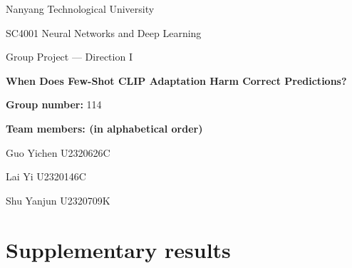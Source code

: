 \documentclass[a4paper,10pt,onecolumn]{article}
\newcommand{\reporttitle}{When Does Few-Shot CLIP Adaptation Harm Correct Predictions?}
\begin{document}
\begin{titlepage}
\centering
\vspace*{25mm}
{\Large Nanyang Technological University\par}
\vspace{12mm}
{\large SC4001 Neural Networks and Deep Learning\par}
{\large Group Project --- Direction I\par}
\vspace{20mm}
{\LARGE\bfseries \reporttitle\par}
\vspace{20mm}
\textbf{Group number:} 114\par
\vspace{8mm}
\textbf{Team members: (in alphabetical order)}\par
Guo Yichen U2320626C\par
Lai Yi  U2320146C\par
Shu Yanjun U2320709K\par
\vfill
\end{titlepage}
\tableofcontents
\clearpage
{}








\label{body-end}
\clearpage
{}
{}


\clearpage
\appendix
\section{Supplementary results}

\end{document}
